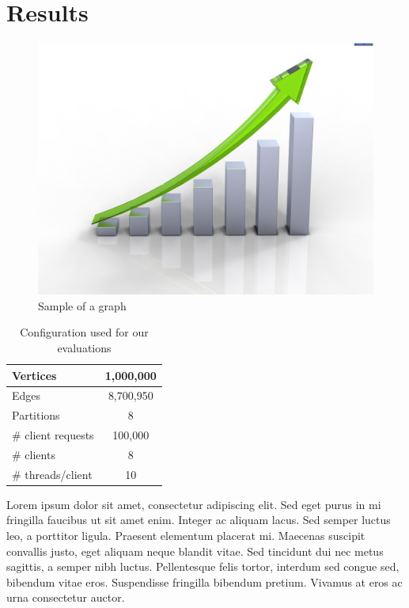 
\section{Results}
\label{sec:results}

\begin{figure}

\includegraphics[keepaspectratio, width=0.35\textheight]
{./img/graph.jpg}
\caption{Sample of a graph}
\label{fig:graph}
\end{figure}

\begin{table}
\centering
\begin{tabular}{ | l | c | }
	\hline
	Vertices & 1,000,000 \\ \hline
	Edges & 8,700,950 \\ \hline
	Partitions & 8 \\ \hline
	\# client requests & 100,000 \\ \hline
	\# clients & 8 \\ \hline
	\# threads/client & 10 \\ \hline
\end{tabular}
\caption{Configuration used for our evaluations}
\label{tbl:graphconfig}
\end{table}

Lorem ipsum dolor sit amet, consectetur adipiscing elit. Sed eget purus in mi fringilla faucibus ut sit amet enim. Integer ac aliquam lacus. Sed semper luctus leo, a porttitor ligula. Praesent elementum placerat mi. Maecenas suscipit convallis justo, eget aliquam neque blandit vitae. Sed tincidunt dui nec metus sagittis, a semper nibh luctus. Pellentesque felis tortor, interdum sed congue sed, bibendum vitae eros. Suspendisse fringilla bibendum pretium. Vivamus at eros ac urna consectetur auctor.